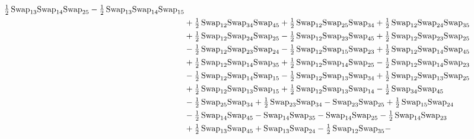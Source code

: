 \documentclass[12pt,dvipsnames,accepted=2016-08-18,a4paper,onecolumn]{quantumarticle}
\numberwithin{equation}{section}
\theoremstyle{definition}
\begin{document}
\begin{align*}
        \tfrac12\,\textnormal{Swap}_{13} \textnormal{Swap}_{14} \textnormal{Swap}_{25} - \tfrac12\,\textnormal{Swap}_{13} \textnormal{Swap}_{14} \textnormal{Swap}_{15}\\ & + \tfrac12\,\textnormal{Swap}_{12} \textnormal{Swap}_{34} \textnormal{Swap}_{45} + \tfrac12\,\textnormal{Swap}_{12} \textnormal{Swap}_{25} \textnormal{Swap}_{34} +
        \tfrac12\,\textnormal{Swap}_{12} \textnormal{Swap}_{24} \textnormal{Swap}_{35}\\ & + \tfrac12\,\textnormal{Swap}_{12} \textnormal{Swap}_{24} \textnormal{Swap}_{25} - \tfrac12\,\textnormal{Swap}_{12} \textnormal{Swap}_{23} \textnormal{Swap}_{45} + \tfrac12\,\textnormal{Swap}_{12} \textnormal{Swap}_{23} \textnormal{Swap}_{25}\\ & -
        \tfrac12\,\textnormal{Swap}_{12} \textnormal{Swap}_{23} \textnormal{Swap}_{24} - \tfrac12\,\textnormal{Swap}_{12} \textnormal{Swap}_{15} \textnormal{Swap}_{23} + \tfrac12\,\textnormal{Swap}_{12} \textnormal{Swap}_{14} \textnormal{Swap}_{45}\\ & + \tfrac12\,\textnormal{Swap}_{12} \textnormal{Swap}_{14} \textnormal{Swap}_{35} +
        \tfrac12\,\textnormal{Swap}_{12} \textnormal{Swap}_{14} \textnormal{Swap}_{25} - \tfrac12\,\textnormal{Swap}_{12} \textnormal{Swap}_{14} \textnormal{Swap}_{23}\\ & - \tfrac12\,\textnormal{Swap}_{12} \textnormal{Swap}_{14} \textnormal{Swap}_{15} - \tfrac12\,\textnormal{Swap}_{12} \textnormal{Swap}_{13} \textnormal{Swap}_{34} +
        \tfrac12\,\textnormal{Swap}_{12} \textnormal{Swap}_{13} \textnormal{Swap}_{25}\\ & + \tfrac12\,\textnormal{Swap}_{12} \textnormal{Swap}_{13} \textnormal{Swap}_{15} + \tfrac12\,\textnormal{Swap}_{12} \textnormal{Swap}_{13} \textnormal{Swap}_{14} - \tfrac12\,\textnormal{Swap}_{34} \textnormal{Swap}_{45} \\ & -
        \tfrac12\,\textnormal{Swap}_{25} \textnormal{Swap}_{34} + \tfrac12\,\textnormal{Swap}_{23} \textnormal{Swap}_{34} - \textnormal{Swap}_{23} \textnormal{Swap}_{25} + \tfrac12\,\textnormal{Swap}_{15} \textnormal{Swap}_{24}\\ & - \tfrac12\,\textnormal{Swap}_{14} \textnormal{Swap}_{45} -
        \textnormal{Swap}_{14} \textnormal{Swap}_{35} - \textnormal{Swap}_{14} \textnormal{Swap}_{25} - \tfrac12\,\textnormal{Swap}_{14} \textnormal{Swap}_{23}\\ & + \tfrac12\,\textnormal{Swap}_{13} \textnormal{Swap}_{45} + \textnormal{Swap}_{13} \textnormal{Swap}_{24} - \tfrac12\,\textnormal{Swap}_{12} \textnormal{Swap}_{35} -

\end{align*}
\end{document}

